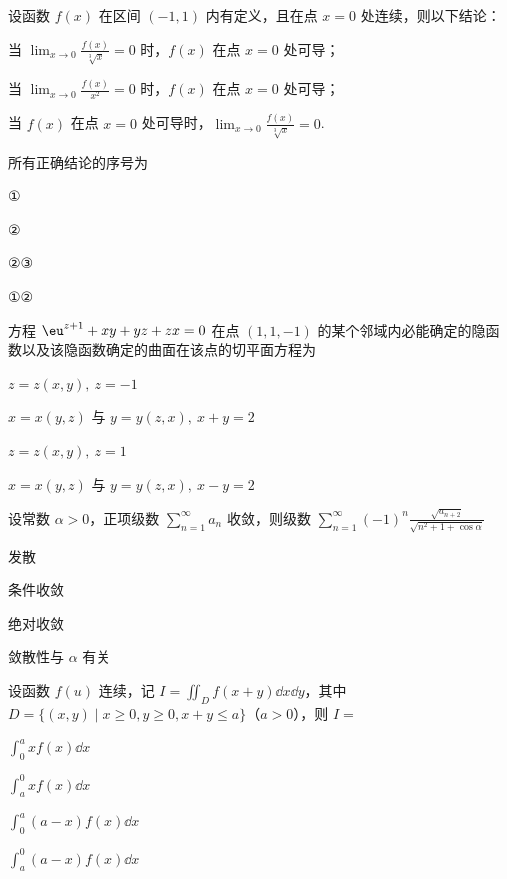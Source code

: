 
\begin{question}[index=1]
设函数 $f(x)$ 在区间 $(-1,1)$ 内有定义，且在点 $x=0$ 处连续，则以下结论：
\par{} 当 $\displaystyle\lim_{x\to0}\frac{f(x)}{\sqrt[3]x}=0$ 时，$f(x)$ 在点 $x=0$ 处可导；
\par{} 当 $\displaystyle\lim_{x\to0}\frac{f(x)}{x^2}=0$ 时，$f(x)$ 在点 $x=0$ 处可导；
\par{} 当 $f(x)$ 在点 $x=0$ 处可导时，$\displaystyle\lim_{x\to0}\frac{f(x)}{\sqrt[3]x}=0$.
\par 所有正确结论的序号为
\begin{choices}[columns=4]
\item ①
\item ②
\item ②③
\item ①②
\end{choices}
\end{question}
\QuestionBreak

\begin{question}[index=2]
方程 $\eu^{z+1}+xy+yz+zx=0$ 在点 $(1,1,-1)$ 的某个邻域内必能确定的隐函数以及该隐函数确定的曲面在该点的切平面方程为
\begin{choices}[columns=2]
\item $z=z(x,y),\ z=-1$
\item $x=x(y,z)$ 与 $y=y(z,x),\ x+y=2$
\item $z=z(x,y),\ z=1$
\item $x=x(y,z)$ 与 $y=y(z,x),\ x-y=2$
\end{choices}
\end{question}
\QuestionBreak

\begin{question}[index=3]
设常数 $\alpha>0$，正项级数 $\displaystyle\sum_{n=1}^\infty a_n$ 收敛，则级数 $\displaystyle\sum_{n=1}^\infty(-1)^n\frac{\sqrt{a_{n+2}}}{\sqrt{n^2+1+\cos\alpha}}$
\begin{choices}[columns=2]
\item 发散
\item 条件收敛
\item 绝对收敛
\item 敛散性与 $\alpha$ 有关
\end{choices}
\end{question}
\QuestionBreak

\begin{question}[index=4]
设函数 $f(u)$ 连续，记 $\displaystyle I=\iint_Df(x+y)\dd x\dd y$，其中 $D=\{(x,y)\mid x\ge0,y\ge0,x+y\le a\}$（$a>0$），则 $I=$
\begin{choices}[columns=2]
\item $\displaystyle\int_0^axf(x)\dd x$
\item $\displaystyle\int_a^0xf(x)\dd x$
\item $\displaystyle\int_0^a(a-x)f(x)\dd x$
\item $\displaystyle\int_a^0(a-x)f(x)\dd x$
\end{choices}
\end{question}
\QuestionBreak

